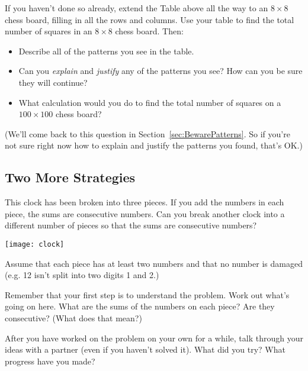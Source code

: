 \begin{thinkpair*}
If you haven't done so already, extend the Table above all the way to an $8\times 8$ chess board, filling in all the rows and columns.  Use your table to find the total number of squares in an $8 \times 8$ chess board.  Then:
\begin{itemize}
\item
Describe all of the patterns you see in the table.  
\item
Can you \emph{explain} and \emph{justify} any of the patterns you see?  How can you be sure they will continue?
\item
What calculation would you do to find the total number of squares on a $100 \times 100$ chess board?
\end{itemize}
\end{thinkpair*}

(We'll come back to this question in Section~\ref{sec:BewarePatterns}.  So if you're not sure right now how to explain and justify the patterns you found, that's OK.)



\subsection{Two More Strategies}
\begin{problem}\label{prob:BrokenClock}
 This clock has been broken into three pieces.  If you add the numbers in each piece, the sums are consecutive numbers.  Can you break another clock into a different number of pieces so that the sums are consecutive numbers?  
\begin{center}
\texttt{[image: clock]}
\end{center}
Assume that each piece has at least two numbers and that no number is damaged (e.g. 12 isn't split into two digits 1 and 2.) 
\end{problem}



Remember that your first step is to understand the problem.  Work out what's going on here.  What are the sums of the numbers on each piece?  Are they consecutive?  (What does that mean?)

\begin{thinkpair*}
After you have worked on the problem on your own for a while, talk through your ideas with a partner (even if you haven't solved it).  What did you try?   What progress have you made?
\end{thinkpair*}



